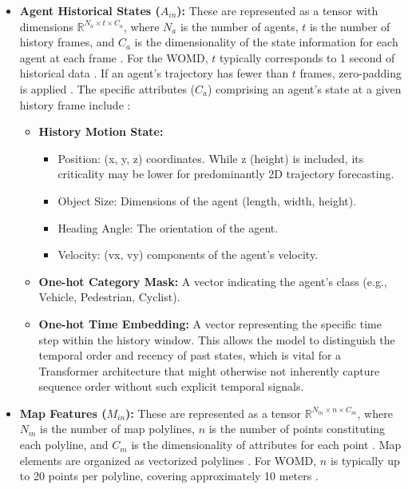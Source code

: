\begin{itemize}
    \item \textbf{Agent Historical States ($A_{in}$):}
    These are represented as a tensor with dimensions $\mathbb{R}^{N_a \times t \times C_a}$, where $N_a$ is the number of agents, $t$ is the number of history frames, and $C_a$ is the dimensionality of the state information for each agent at each frame \cite{Shi2022MTR}. For the WOMD, $t$ typically corresponds to 1 second of historical data \cite{WOMD2021}. If an agent's trajectory has fewer than $t$ frames, zero-padding is applied \cite{Shi2022MTR}.
    The specific attributes ($C_a$) comprising an agent's state at a given history frame include \cite{Shi2022MTR, Shi2022MTR_A}:
    \begin{itemize}
        \item \textbf{History Motion State:}
        \begin{itemize}
            \item Position: (x, y, z) coordinates. While z (height) is included, its criticality may be lower for predominantly 2D trajectory forecasting.
            \item Object Size: Dimensions of the agent (length, width, height).
            \item Heading Angle: The orientation of the agent.
            \item Velocity: (vx, vy) components of the agent's velocity.
        \end{itemize}
        \item \textbf{One-hot Category Mask:} A vector indicating the agent's class (e.g., Vehicle, Pedestrian, Cyclist).
        \item \textbf{One-hot Time Embedding:} A vector representing the specific time step within the history window. This allows the model to distinguish the temporal order and recency of past states, which is vital for a Transformer architecture that might otherwise not inherently capture sequence order without such explicit temporal signals.
    \end{itemize}
    \item \textbf{Map Features ($M_{in}$):}
    These are represented as a tensor $\mathbb{R}^{N_m \times n \times C_m}$, where $N_m$ is the number of map polylines, $n$ is the number of points constituting each polyline, and $C_m$ is the dimensionality of attributes for each point \cite{Shi2022MTR}. Map elements are organized as vectorized polylines \cite{Shi2022MTR, Shi2022MTR_A}. For WOMD, $n$ is typically up to 20 points per polyline, covering approximately 10 meters \cite{Shi2022MTR_A}.

\end{itemize}
